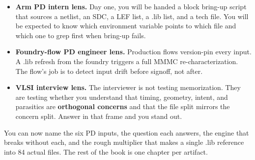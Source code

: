 \begin{pdnote}
\begin{itemize}[leftmargin=1.2em]
  \item \textbf{Arm PD intern lens.} Day one, you will be handed a block bring-up script that sources a netlist, an SDC, a LEF list, a .lib list, and a tech file. You will be expected to know which environment variable points to which file and which one to grep first when bring-up fails.
  \item \textbf{Foundry-flow PD engineer lens.} Production flows version-pin every input. A .lib refresh from the foundry triggers a full MMMC re-characterization. The flow's job is to detect input drift before signoff, not after.
  \item \textbf{VLSI interview lens.} The interviewer is not testing memorization. They are testing whether you understand that timing, geometry, intent, and parasitics are \textbf{orthogonal concerns} and that the file split mirrors the concern split. Answer in that frame and you stand out.
\end{itemize}
\end{pdnote}

\begin{checkpoint}
You can now name the six PD inputs, the question each answers, the engine that breaks without each, and the rough multiplier that makes a single .lib reference into 84 actual files. The rest of the book is one chapter per artifact.

\end{checkpoint}

